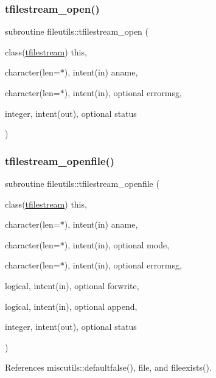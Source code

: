 \subsubsection{\texorpdfstring{tfilestream\+\_\+open()}{tfilestream\_open()}}
{\footnotesize\ttfamily subroutine fileutils\+::tfilestream\+\_\+open (\begin{DoxyParamCaption}\item[{class(\mbox{\hyperlink{structfileutils_1_1tfilestream}{tfilestream}})}]{this,  }\item[{character(len=$\ast$), intent(in)}]{aname,  }\item[{character(len=$\ast$), intent(in), optional}]{errormsg,  }\item[{integer, intent(out), optional}]{status }\end{DoxyParamCaption})\hspace{0.3cm}{\ttfamily [private]}}

\mbox{\label{namespacefileutils_ae08cbb1a056e184eeab9c6a6a2181f24}} 
\subsubsection{\texorpdfstring{tfilestream\+\_\+openfile()}{tfilestream\_openfile()}}
{\footnotesize\ttfamily subroutine fileutils\+::tfilestream\+\_\+openfile (\begin{DoxyParamCaption}\item[{class(\mbox{\hyperlink{structfileutils_1_1tfilestream}{tfilestream}})}]{this,  }\item[{character(len=$\ast$), intent(in)}]{aname,  }\item[{character(len=$\ast$), intent(in), optional}]{mode,  }\item[{character(len=$\ast$), intent(in), optional}]{errormsg,  }\item[{logical, intent(in), optional}]{forwrite,  }\item[{logical, intent(in), optional}]{append,  }\item[{integer, intent(out), optional}]{status }\end{DoxyParamCaption})\hspace{0.3cm}{\ttfamily [private]}}



References miscutils\+::defaultfalse(), file, and fileexists().

